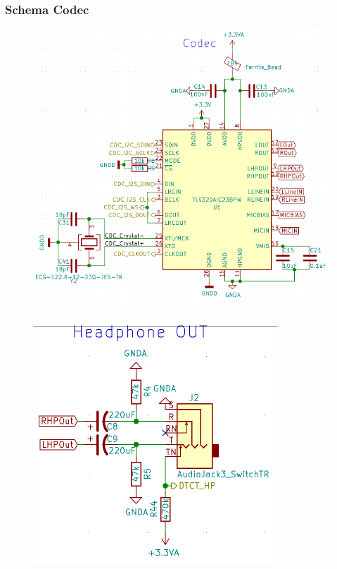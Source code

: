 \subsubsection{Schema Codec}
\label{sec:Schema_Codec}



\begin{figure} [H]
\begin{center}
\includegraphics[scale=0.5]{../graphics/Schema_Codec.png}
\caption{}
\label{fig:Schema_Codec}
\end{center}
\end{figure}

\begin{figure} [H]
\begin{center}
 \includegraphics[scale=0.5]{../graphics/Schema_HPOUT.png}\caption{}
\label{fig:Schema_Codec}
\end{center}
\end{figure}

